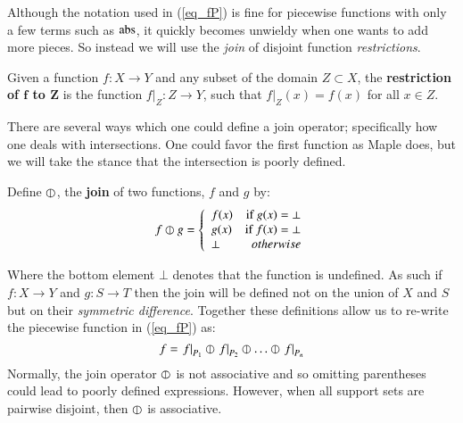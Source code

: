 Although the notation used in (\ref{eq_fP}) is fine for piecewise functions with only a few terms such as $\text{abs}$,
it quickly becomes unwieldy when one wants to add more pieces.
So instead we will use the \emph{join} of disjoint function \emph{restrictions}.
\begin{definition}
	Given a function $f:X \to Y$ and any subset of the domain $Z \subset X$, 
	the \textbf{restriction of $\boldsymbol{f}$ to $\boldsymbol{Z}$} is the function $f|_Z : Z \to Y$, 
	such that $f|_Z(x) = f(x)$ for all $x \in Z$.
\end{definition}


There are several ways which one could define a join operator; specifically how one deals with intersections.
One could favor the first function as Maple does, but we will take the stance that the intersection is poorly defined.
\begin{definition}
	Define $\varobar$, the \textbf{join} of two functions, $f$ and $g$ by:
	\begin{equation}
	\label{def:fjoin}
		f \varobar g =  
		\left\{
	     		\begin{array}{lr}
	       		f(x) & \text{if } g(x) = \bot \\
	       		g(x) & \text{if } f(x) = \bot \\
	       		\bot & otherwise
	     		\end{array}
	   	\right.
	\end{equation}
\end{definition}
Where the bottom element $\bot$ denotes that the function is undefined.
As such if $f:X \to Y$ and $g:S \to T$ then the join will be defined not on the union of $X$ and $S$ but on their 
\emph{symmetric difference}.
Together these definitions allow us to re-write the piecewise function in (\ref{eq_fP}) as:
\begin{equation*}
	f = \left.f\right|_{P_1} \varobar \left.f\right|_{P_2} \varobar \ldots \varobar \left.f\right|_{P_n}
\end{equation*}
Normally, the join operator $\varobar$ is not associative and so omitting parentheses could lead to poorly defined expressions.
However, when all support sets are pairwise disjoint, then $\varobar$ is associative.


